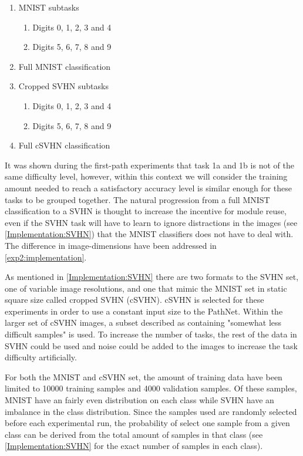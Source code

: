\begin{enumerate}
    \item MNIST subtasks
    \begin{enumerate}
        \item Digits 0, 1, 2, 3 and 4
        \item Digits 5, 6, 7, 8 and 9 
    \end{enumerate}
    \item Full MNIST classification
    \item Cropped SVHN subtasks
    \begin{enumerate}
        \item Digits 0, 1, 2, 3 and 4
        \item Digits 5, 6, 7, 8 and 9 
    \end{enumerate}
    \item Full cSVHN classification
\end{enumerate}

It was shown during the first-path experiments that task 1a and 1b is not of the same difficulty level, however, within this context we will consider the training amount needed to reach a satisfactory accuracy level is similar enough for these tasks to be grouped together. The natural progression from a full MNIST classification to a SVHN is thought to increase the incentive for module reuse, even if the SVHN task will have to learn to ignore distractions in the images (see \ref{Implementation:SVHN}) that the MNIST classifiers does not have to deal with. The difference in image-dimensions have been addressed in \ref{exp2:implementation}.

As mentioned in \ref{Implementation:SVHN} there are two formats to the SVHN set, one of variable image resolutions, and one that mimic the MNIST set in static square size called cropped SVHN (cSVHN). cSVHN is selected for these experiments in order to use a constant input size to the PathNet. Within the larger set of cSVHN images, a subset described as containing "somewhat less difficult samples" is used. To increase the number of tasks, the rest of the data in SVHN could be used and noise could be added to the images to increase the task difficulty artificially. 

For both the MNIST and cSVHN set, the amount of training data have been limited to 10000 training samples and 4000 validation samples. Of these samples, MNIST have an fairly even distribution on each class while SVHN have an imbalance in the class distribution. Since the samples used are randomly selected before each experimental run, the probability of select one sample from a given class can be derived from the total amount of samples in that class (see \ref{Implementation:SVHN} for the exact number of samples in each class).

